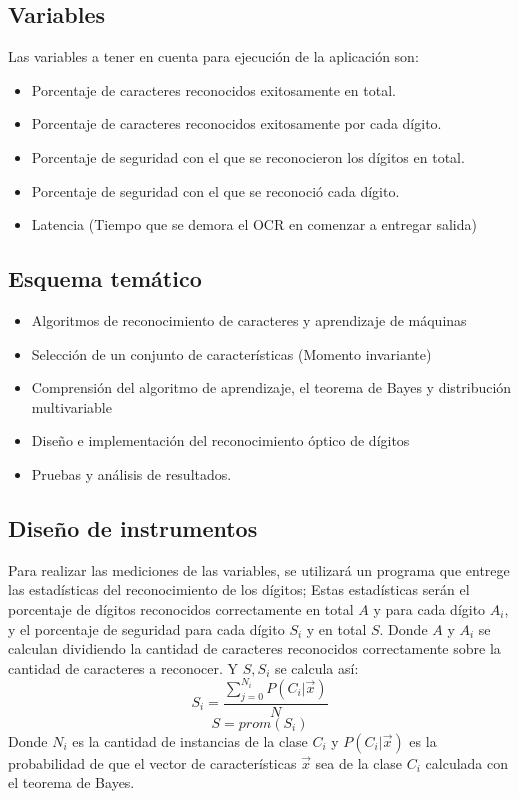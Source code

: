 \documentclass[a4paper, 11pt, oneside]{article}
\begin{document}
	\subsection{Variables}
	Las variables a tener en cuenta para ejecución de la aplicación son:
	\begin{itemize}
	\item Porcentaje de caracteres reconocidos exitosamente en total.
	\item Porcentaje de caracteres reconocidos exitosamente por cada dígito.
	\item Porcentaje de seguridad con el que se reconocieron los dígitos en total.
	\item Porcentaje de seguridad con el que se reconoció cada dígito.
	\item Latencia (Tiempo que se demora el OCR en comenzar a entregar salida)
	\end{itemize}
		
	\subsection{Esquema temático}
	\begin{itemize}
		\item Algoritmos de reconocimiento de caracteres y aprendizaje de máquinas
		\item Selección de un conjunto de características (Momento invariante)
		\item Comprensión del algoritmo de aprendizaje, el teorema de Bayes y distribución multivariable
		\item Diseño e implementación del reconocimiento óptico de dígitos
		\item Pruebas y análisis de resultados.
	\end{itemize}
	
	\subsection{Diseño de instrumentos}
	Para realizar las mediciones de las variables, se utilizará un programa que entrege las estadísticas
	del reconocimiento de los dígitos; Estas estadísticas serán el porcentaje de dígitos reconocidos
	correctamente en total $A$ y para cada dígito $A_i$, y el porcentaje de seguridad para cada dígito $S_i$
	y en total $S$. Donde $A$ y $A_i$ se calculan dividiendo la cantidad de caracteres reconocidos correctamente
	sobre la cantidad de caracteres a reconocer. Y $S,S_i$ se calcula así: 
	\[ S_i = \frac{ \sum_{j=0}^{N_i}P(C_i|\vec{x}) }{N} \]
	\[ S = prom(S_i) \]
	Donde $N_i$ es la cantidad de instancias de la clase $C_i$ y $P(C_i|\vec{x})$ es la probabilidad de que el
	vector de características $\vec{x}$ sea de la clase $C_i$ calculada con el teorema de Bayes.
	
\end{document}
